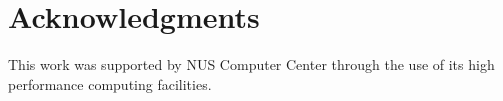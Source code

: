 \documentclass{aamas2016_extendedabstract}
\begin{document}
\section*{Acknowledgments}
This work was supported by NUS Computer Center
through the use of its high performance computing facilities.
%
%

%
\end{document}
